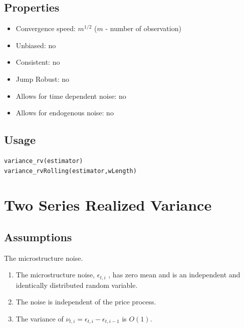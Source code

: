 \documentclass[letterpaper]{report}
\begin{document}
\subsection{Properties}
\begin{itemize}
\item Convergence speed: $m^{1/2}$ ($m$ - number of observation)
\item Unbiased: no
\item Consistent: no
\item Jump Robust: no
\item Allows for time dependent noise: no
\item Allows for endogenous noise: no
\end{itemize}
\subsection{Usage}
\begin{lstlisting}
variance_rv(estimator)
variance_rvRolling(estimator,wLength)
\end{lstlisting}
 
 
\section{Two Series Realized Variance}
\subsection{Assumptions}
The microstructure noise.
\begin{enumerate}
\item The microstructure noise, $\epsilon_{t,i}$ , has zero mean and is an
independent and identically distributed random variable.
\item The noise is independent of the price process.
\item  The variance of $\nu_{t,i} = \epsilon_{t,i} - \epsilon_{t,i-1}$ is
$O(1)$.
\end{enumerate}
\end{document}
